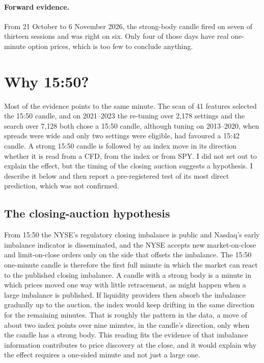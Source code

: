 \documentclass[12pt,letterpaper]{article}
\begin{document}
\paragraph{Forward evidence.} From 21 October to 6 November 2026, the strong-body
candle fired on seven of thirteen sessions and was right on six. Only four of those days have real one-minute option prices, which is too few to
conclude anything.

\section{Why 15:50?}
\label{sec:why}

Most of the evidence points to the same minute. The scan of 41 features
selected the 15:50 candle, and on 2021--2023 the re-tuning over 2{,}178
settings and the search over 7{,}128 both chose a 15:50 candle, although tuning
on 2013--2020, when spreads were wide
and only two settings were eligible, had favoured a 15:42 candle. A strong 15:50
candle is followed by an index move in its direction whether it is read from a
CFD, from the index or from SPY. I did not set out to explain the effect, but the timing of the closing auction
suggests a hypothesis. I describe it below and then report a pre-registered
test of its most direct prediction, which was not confirmed.

\subsection{The closing-auction hypothesis}
\label{sec:hypothesis}

From 15:50 the NYSE's regulatory closing imbalance is public and Nasdaq's early
imbalance indicator is disseminated, and the NYSE accepts new market-on-close and
limit-on-close orders only on the side that offsets the imbalance. The 15:50
one-minute candle is therefore the first full minute in which the market can
react to the published closing imbalance. A candle with a strong body is a minute
in which prices moved one way with little retracement, as might happen when a
large imbalance is published. If liquidity providers then absorb the imbalance
gradually up to the auction, the index would keep drifting in the same direction
for the remaining minutes. That is roughly the pattern in the data, a move of about two index points over
nine minutes, in the candle's direction, only when the candle has a
strong body. This reading fits the evidence of \citet{bm2023} that imbalance
information contributes to price discovery at the close, and it would explain why
the effect requires a one-sided minute and not just a large one.
\end{document}
